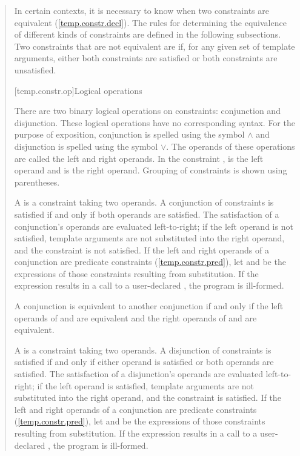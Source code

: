 \begin{quote}
\pnum 
In certain contexts, it is necessary to know when two constraints are equivalent
(\ref{temp.constr.decl}). 
% 
The rules for determining the equivalence of different kinds of
constraints are defined in the following subsections.
% 
Two constraints that are not equivalent are  if,
for any given set of template arguments, either both constraints are satisfied
or both constraints are unsatisfied.


[temp.constr.op]{Logical operations}

\pnum
There are two binary logical operations on constraints: conjunction
and disjunction.
% 
\enternote 
These logical operations have no corresponding \Cpp syntax.
For the purpose of exposition, conjunction is spelled
using the symbol $\land$ and disjunction is spelled using the 
symbol $\lor$. 
% 
The operands of these operations are called the left 
and right operands. In the constraint ,
 is the left operand and  is the right operand.
% 
Grouping of constraints is shown using parentheses.
\exitnote

\pnum
A  is a constraint taking two 
operands. A conjunction of constraints is satisfied if and only 
if both operands are satisfied. 
% 
The satisfaction of a conjunction's operands are evaluated left-to-right; 
if the left operand is not satisfied, template arguments are not 
substituted into the right operand, and the constraint is not satisfied.
% 
If the left and right operands of a conjunction are predicate constraints
(\ref{temp.constr.pred}), let  and  be the expressions
of those constraints resulting from substitution. If the expression
 results in a call to a user-declared ,
the program is ill-formed.

A conjunction  is equivalent to another conjunction 
if and only if the left operands of  and  are equivalent
and the right operands of  and  are equivalent.

\pnum
A  is a constraint taking two 
operands. A disjunction of constraints is satisfied if and only 
if either operand is satisfied or both operands are satisfied.
% 
The satisfaction of a disjunction's operands are evaluated left-to-right; 
if the left operand is satisfied, template arguments are not 
substituted into the right operand, and the constraint is satisfied.
%
If the left and right operands of a conjunction are predicate constraints
(\ref{temp.constr.pred}), let  and  be the expressions
of those constraints resulting from substitution. If the expression
 results in a call to a user-declared ,
the program is ill-formed.


\end{quote}

